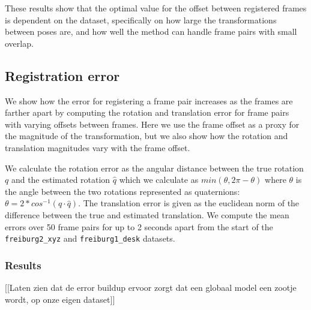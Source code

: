 \documentclass[a4paper]{article}
\begin{document}
These results show that the optimal value for the offset between registered frames is dependent on the dataset, specifically on how large the transformations between poses are, and how well the method can handle frame pairs with small overlap.

\subsection{Registration error}
\label{registration_error}

We show how the error for registering a frame pair increases as the frames are farther apart by computing the rotation and translation error for frame pairs with varying offsets between frames. Here we use the frame offset as a proxy for the magnitude of the transformation, but we also show how the rotation and translation magnitudes vary with the frame offset.

We calculate the rotation error as the angular distance between the true rotation $q$ and the estimated rotation $\hat q$ which we calculate as $min(\theta, 2\pi - \theta)$ where $\theta$ is the angle between the two rotations represented as quaternions: $\theta = 2 * cos^{-1}(q \cdot \hat q)$. %
The translation error is given as the euclidean norm of the difference between the true and estimated translation. We compute the mean errors over 50 frame pairs for up to 2 seconds apart from the start of the \texttt{freiburg2\_xyz} and \texttt{freiburg1\_desk} datasets.

\subsubsection{Results}



[[Laten zien dat de error buildup ervoor zorgt dat een globaal model een zootje wordt, op onze eigen dataset]]
\end{document}
